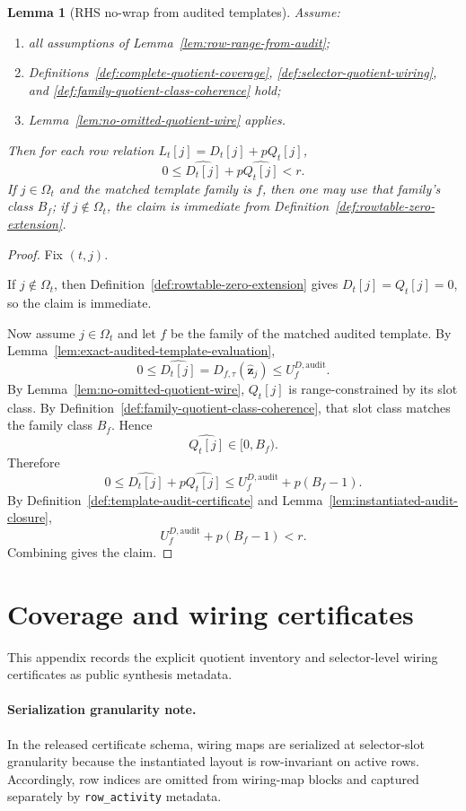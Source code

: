 ﻿\documentclass[11pt]{article}
\newtheorem{lemma}[theorem]{Lemma}
\newcommand{\wt}[1]{\widehat{#1}}
\begin{document}
\begin{lemma}[RHS no-wrap from audited templates]
\label{lem:rhs-nowrap-from-audit}
Assume:
\begin{enumerate}[label=(\roman*),leftmargin=2em]
    \item all assumptions of Lemma~\ref{lem:row-range-from-audit};
    \item Definitions~\ref{def:complete-quotient-coverage},
    \ref{def:selector-quotient-wiring}, and
    \ref{def:family-quotient-class-coherence} hold;
    \item Lemma~\ref{lem:no-omitted-quotient-wire} applies.
\end{enumerate}
Then for each row relation \(L_t[j]=D_t[j]+pQ_t[j]\),
\[
0\le \wt{D_t[j]}+p\wt{Q_t[j]}<r.
\]
If \(j\in\Omega_t\) and the matched template family is \(f\), then one may use
that family's class \(B_f\); if \(j\notin\Omega_t\), the claim is immediate
from Definition~\ref{def:rowtable-zero-extension}.
\end{lemma}

\begin{proof}
Fix \((t,j)\).

If \(j\notin\Omega_t\), then Definition~\ref{def:rowtable-zero-extension}
gives \(D_t[j]=Q_t[j]=0\), so the claim is immediate.

Now assume \(j\in\Omega_t\) and let \(f\) be the family of the matched audited
template. By Lemma~\ref{lem:exact-audited-template-evaluation},
\[
0\le \wt{D_t[j]} = D_{f,\tau}(\wt{\mathbf z}_j)\le U_f^{D,\mathrm{audit}}.
\]
By Lemma~\ref{lem:no-omitted-quotient-wire}, \(Q_t[j]\) is range-constrained by
its slot class. By Definition~\ref{def:family-quotient-class-coherence}, that
slot class matches the family class \(B_f\). Hence
\[
\wt{Q_t[j]}\in[0,B_f).
\]
Therefore
\[
0\le \wt{D_t[j]}+p\wt{Q_t[j]}
\le
U_f^{D,\mathrm{audit}}+p(B_f-1).
\]
By Definition~\ref{def:template-audit-certificate} and
Lemma~\ref{lem:instantiated-audit-closure},
\[
U_f^{D,\mathrm{audit}}+p(B_f-1)<r.
\]
Combining gives the claim.
\end{proof}

\section{Coverage and wiring certificates}
\label{app:coverage-and-wiring}
This appendix records the explicit quotient inventory and selector-level
wiring certificates as public synthesis metadata.
\paragraph{Serialization granularity note.}
In the released certificate schema, wiring maps are serialized at
selector-slot granularity because the instantiated layout is row-invariant on
active rows. Accordingly, row indices are omitted from wiring-map blocks and
captured separately by \texttt{row\_activity} metadata.
\end{document}
